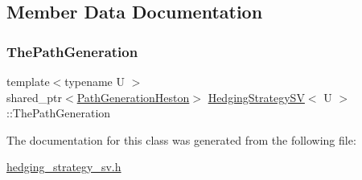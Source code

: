 \subsection{Member Data Documentation}
\hypertarget{classHedgingStrategySV_aa341650c5b2846606e59e3e6c6225aca}{}\label{classHedgingStrategySV_aa341650c5b2846606e59e3e6c6225aca} 
\subsubsection{\texorpdfstring{The\+Path\+Generation}{ThePathGeneration}}
{\footnotesize\ttfamily template$<$typename U $>$ \\
shared\+\_\+ptr$<$\hyperlink{classPathGenerationHeston}{Path\+Generation\+Heston}$>$ \hyperlink{classHedgingStrategySV}{Hedging\+Strategy\+SV}$<$ U $>$\+::The\+Path\+Generation\hspace{0.3cm}{\ttfamily [protected]}}



The documentation for this class was generated from the following file\+:\begin{DoxyCompactItemize}
\item 
\hyperlink{hedging__strategy__sv_8h}{hedging\+\_\+strategy\+\_\+sv.\+h}\end{DoxyCompactItemize}
